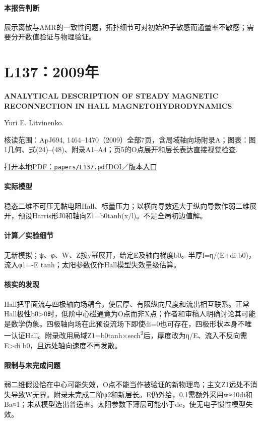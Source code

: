 \paragraph{本报告判断}展示离散与AMR的一致性问题，拓扑细节可对初始种子敏感而通量率不敏感；需要分开数值验证与物理验证。

\section{L137：2009年}\label{paper:L137}

\textbf{ANALYTICAL DESCRIPTION OF STEADY MAGNETIC RECONNECTION IN HALL MAGNETOHYDRODYNAMICS}\citep{L137}\

Yuri E. Litvinenko.

\textsf{核读范围：}ApJ694, 1464–1470（2009）全部7页，含局域轴向场附录A；\textsf{图表：}图1几何、式(24)–(48)、附录A1–A4；页5的O点展开和层长表达直接视觉检查.

\href{run:papers/L137.pdf}{打开本地PDF：\texttt{papers/L137.pdf}}\quad\href{https://doi.org/10.1088/0004-637x/694/2/1464}{DOI／版本入口}

\paragraph{实际模型}稳态二维不可压无黏电阻Hall、标量压力；以横向导数远大于纵向导数作弱二维展开，预设Harris形J0和轴向Z1=b0tanh(x/l)。不是全局初边值解。

\paragraph{计算／实验细节}无新模拟；ψ、φ、W、Z按y幂展开，给定E及轴向梯度b0。半厚l=η/(E+di b0)，流入φ1=-E tanh；太阳参数仅作Hall模型失效量级估算。

\paragraph{核实的发现}Hall把平面流与四极轴向场耦合，使层厚、有限纵向尺度和流出相互联系。正常Hall极性b0>0时，低阶中心磁通竟为O点而非X点；作者和审稿人明确讨论其可能是数学伪象。四极轴向场在此预设流场下即使di=0也可存在，四极形状本身不唯一认证Hall。附录改用局域Z1=b0tanh×sech\textsuperscript{2}后，厚度改为η/E、流入不反向需E>di b0，且远处轴向速度不再发散。

\paragraph{限制与未完成问题}弱二维假设恰在中心可能失效，O点不能当作被验证的新物理岛；主文Z1远处不消失导致W无界。附录未完成二阶ψ2和新层长。E仍外给，0.1需额外采用w≈10di和Ba≈1；未从模型选出普适率。太阳参数下薄层可能小于de，使无电子惯性模型失效。

